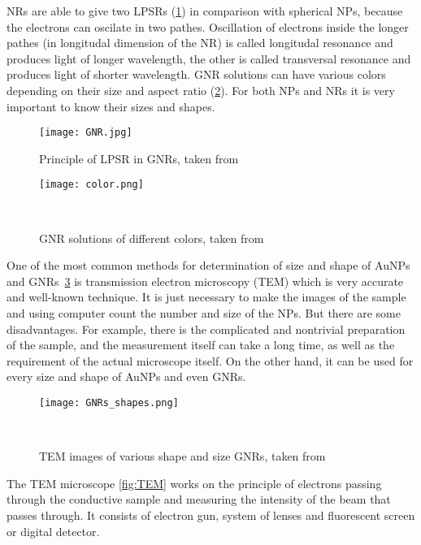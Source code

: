         NRs are able to give two LPSRs (\ref{fig:GNR}) in comparison with spherical NPs, because the electrons can oscilate in two pathes. Oscillation of electrons inside the longer pathes
        (in longitudal dimension of the NR) is called longitudal resonance and produces light of longer wavelength, the other is called transversal resonance and
        produces light of shorter wavelength. GNR solutions can have various colors depending on their size and aspect ratio (\ref{fig:color}). \cite{4, 5, 6, 7, 8}
        For both NPs and NRs it is very important to know their sizes and shapes.
        
        \begin{figure}[h]
            \texttt{[image: GNR.jpg]}
            \caption{Principle of LPSR in GNRs, taken from~\cite{19}}
            \label{fig:GNR}
        \end{figure}

        \begin{figure}[h]
            \texttt{[image: color.png]}
            \caption{GNR solutions of different colors, taken from~\cite{32}}~\label{fig:color}
        \end{figure}

        One of the most common methods for determination of size and shape of AuNPs and GNRs~\ref{fig:GNR_shape} is transmission electron microscopy (TEM) which is very accurate and well-known technique.
        It is just necessary to make the images of the sample and using computer count the number and size of the NPs. But there are some disadvantages. For example,
        there is the complicated and nontrivial preparation of the sample, and the measurement itself can take a long time, as well as the requirement of the actual microscope itself.
        On the other hand, it can be used for every size and shape of AuNPs and even GNRs.~\cite{42}

        \begin{figure}[h]
            \texttt{[image: GNRs\_shapes.png]}
            \caption{TEM images of various shape and size GNRs, taken from~\cite{20}}~\label{fig:GNR_shape}
        \end{figure}

        The TEM microscope \ref{fig:TEM} works on the principle of electrons passing through the conductive sample and measuring the intensity of the beam that passes through.
        It consists of electron gun, system of lenses and fluorescent screen or digital detector.~\cite{7}

